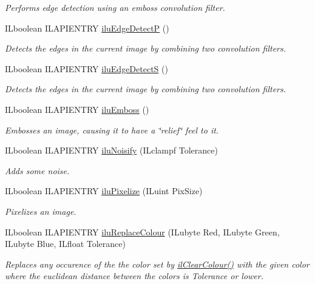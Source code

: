 \begin{DoxyCompactItemize}
\begin{DoxyCompactList}\small\item\em Performs edge detection using an emboss convolution filter. \end{DoxyCompactList}\item 
I\+Lboolean I\+L\+A\+P\+I\+E\+N\+T\+R\+Y \hyperlink{group__ilu__filter_gac902e008927e48ce132306e344f5010d}{ilu\+Edge\+Detect\+P} ()
\begin{DoxyCompactList}\small\item\em Detects the edges in the current image by combining two convolution filters. \end{DoxyCompactList}\item 
I\+Lboolean I\+L\+A\+P\+I\+E\+N\+T\+R\+Y \hyperlink{group__ilu__filter_ga91f176b607f5357b748079e21a6bbc63}{ilu\+Edge\+Detect\+S} ()
\begin{DoxyCompactList}\small\item\em Detects the edges in the current image by combining two convolution filters. \end{DoxyCompactList}\item 
I\+Lboolean I\+L\+A\+P\+I\+E\+N\+T\+R\+Y \hyperlink{group__ilu__filter_gab94eba669177860af590c7bed1927c30}{ilu\+Emboss} ()
\begin{DoxyCompactList}\small\item\em Embosses an image, causing it to have a \char`\"{}relief\char`\"{} feel to it. \end{DoxyCompactList}\item 
I\+Lboolean I\+L\+A\+P\+I\+E\+N\+T\+R\+Y \hyperlink{group__ilu__filter_gac4c1596626e01c41075c7fdeda113642}{ilu\+Noisify} (I\+Lclampf Tolerance)
\begin{DoxyCompactList}\small\item\em Adds some noise. \end{DoxyCompactList}\item 
I\+Lboolean I\+L\+A\+P\+I\+E\+N\+T\+R\+Y \hyperlink{group__ilu__filter_ga609a51f490472174047feaf70918e3ac}{ilu\+Pixelize} (I\+Luint Pix\+Size)
\begin{DoxyCompactList}\small\item\em Pixelizes an image. \end{DoxyCompactList}\item 
I\+Lboolean I\+L\+A\+P\+I\+E\+N\+T\+R\+Y \hyperlink{group__ilu__filter_gac3447a57b322058f1c2e49faa724e4f0}{ilu\+Replace\+Colour} (I\+Lubyte Red, I\+Lubyte Green, I\+Lubyte Blue, I\+Lfloat Tolerance)
\begin{DoxyCompactList}\small\item\em Replaces any occurence of the the color set by \hyperlink{group__state_gaca1dc7f7b8e61eb134060c9c8a8b72f2}{il\+Clear\+Colour()} with the given color where the euclidean distance between the colors is {\itshape Tolerance} or lower. \end{DoxyCompactList}\item 

\end{DoxyCompactItemize}

